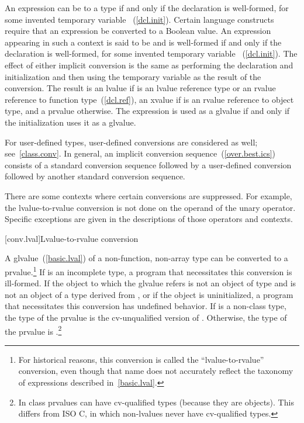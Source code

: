 \pnum
An expression  can be
%
 to a type  if and only if the
declaration  is well-formed, for some invented temporary
variable ~(\ref{dcl.init}).
Certain language constructs require that an expression be converted to a Boolean
value. An expression  appearing in such a context is said to be
%
 and is well-formed if and only if
the declaration  is well-formed, for some invented temporary
variable ~(\ref{dcl.init}).
The effect of either implicit
conversion is the same as performing the declaration and initialization
and then using the temporary variable as the result of the conversion.
The result is an lvalue if  is an lvalue reference
type or an rvalue reference to function type~(\ref{dcl.ref}),
an xvalue if  is an rvalue reference to object type,
and a prvalue otherwise. The expression 
is used as a glvalue if and only if the initialization uses it as a glvalue.

\pnum
\enternote 
For user-defined types, user-defined conversions are considered as well;
see~\ref{class.conv}. In general, an implicit conversion
sequence~(\ref{over.best.ics}) consists of a standard conversion
sequence followed by a user-defined conversion followed by another
standard conversion sequence.
\exitnote 

\pnum
\enternote 
There are some contexts where certain conversions are suppressed. For
example, the lvalue-to-rvalue conversion is not done on the operand of
the unary \tcode{\&} operator. Specific exceptions are given in the
descriptions of those operators and contexts.
\exitnote 

[conv.lval]{Lvalue-to-rvalue conversion}

\pnum
{}%
%
A glvalue~(\ref{basic.lval}) of a non-function, non-array type 
can be converted to
a prvalue.\footnote{For historical reasons, this conversion is called the ``lvalue-to-rvalue''
conversion, even though that name does not accurately reflect the taxonomy
of expressions described in~\ref{basic.lval}.}
If  is an incomplete type, a
program that necessitates this conversion is ill-formed. If the object
to which the glvalue refers is not an object of type  and is not
an object of a type derived from , or if the object is
uninitialized, a program that necessitates this conversion has undefined
behavior. If  is a non-class type, the type of the prvalue is
the cv-unqualified version of . Otherwise, the type of the
prvalue is .\footnote{In \Cpp class prvalues can have cv-qualified types (because they are
objects). This differs from ISO C, in which non-lvalues never have
cv-qualified types.}

